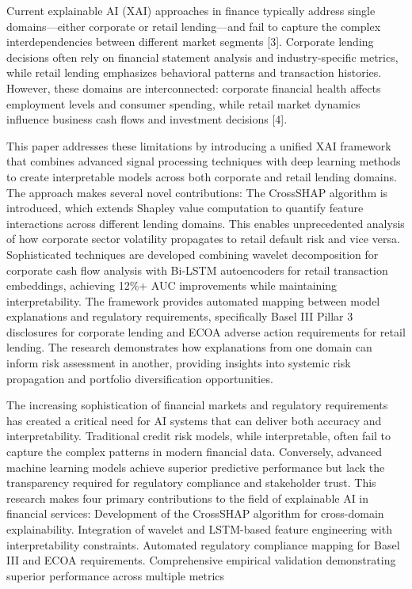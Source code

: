 \documentclass[a4 paper, 11pt,twoside]{article}
\newcommand{\0}{\Bf{0}}
\theoremstyle{definition}
\begin{document}
Current explainable AI (XAI) approaches in finance typically address single domains—either corporate or retail lending—and fail to capture the complex interdependencies between different market segments [3]. Corporate lending decisions often rely on financial statement analysis and industry-specific metrics, while retail lending emphasizes behavioral patterns and transaction histories. However, these domains are interconnected: corporate financial health affects employment levels and consumer spending, while retail market dynamics influence business cash flows and investment decisions [4].

This paper addresses these limitations by introducing a unified XAI framework that combines advanced signal processing techniques with deep learning methods to create interpretable models across both corporate and retail lending domains. The approach makes several novel contributions: The CrossSHAP algorithm is introduced, which extends Shapley value computation to quantify feature interactions across different lending domains. This enables unprecedented analysis of how corporate sector volatility propagates to retail default risk and vice versa. Sophisticated techniques are developed combining wavelet decomposition for corporate cash flow analysis with Bi-LSTM autoencoders for retail transaction embeddings, achieving 12\%+ AUC improvements while maintaining interpretability. The framework provides automated mapping between model explanations and regulatory requirements, specifically Basel III Pillar 3 disclosures for corporate lending and ECOA adverse action requirements for retail lending. The research demonstrates how explanations from one domain can inform risk assessment in another, providing insights into systemic risk propagation and portfolio diversification opportunities.

The increasing sophistication of financial markets and regulatory requirements has created a critical need for AI systems that can deliver both accuracy and interpretability. Traditional credit risk models, while interpretable, often fail to capture the complex patterns in modern financial data. Conversely, advanced machine learning models achieve superior predictive performance but lack the transparency required for regulatory compliance and stakeholder trust.
This research makes four primary contributions to the field of explainable AI in financial services: Development of the CrossSHAP algorithm for cross-domain explainability. Integration of wavelet and LSTM-based feature engineering with interpretability constraints. Automated regulatory compliance mapping for Basel III and ECOA requirements. Comprehensive empirical validation demonstrating superior performance across multiple metrics
\end{document}

